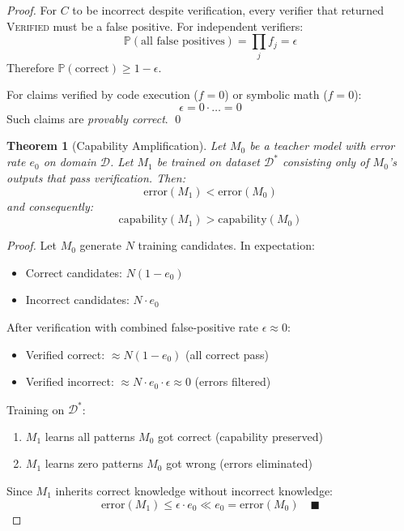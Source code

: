 \documentclass[11pt,a4paper]{article}
\newtheorem{theorem}{Theorem}[section]
\newcommand{\prob}{\mathbb{P}}
\newcommand{\calD}{\mathcal{D}}
\begin{document}
\begin{proof}
For $C$ to be incorrect despite verification, every verifier that returned \textsc{Verified} must be a false positive. For independent verifiers:
\begin{equation}
    \prob(\text{all false positives}) = \prod_j f_j = \epsilon
\end{equation}
Therefore $\prob(\text{correct}) \geq 1 - \epsilon$.

For claims verified by code execution ($f = 0$) or symbolic math ($f = 0$):
\begin{equation}
    \epsilon = 0 \cdot \ldots = 0
\end{equation}
Such claims are \emph{provably correct}. \qed
\end{proof}

\begin{theorem}[Capability Amplification]
\label{thm:amplification}
Let $M_0$ be a teacher model with error rate $e_0$ on domain $\calD$. Let $M_1$ be trained on dataset $\calD^*$ consisting only of $M_0$'s outputs that pass verification. Then:
\begin{equation}
    \text{error}(M_1) < \text{error}(M_0)
\end{equation}
and consequently:
\begin{equation}
    \text{capability}(M_1) > \text{capability}(M_0)
\end{equation}
\end{theorem}

\begin{proof}
Let $M_0$ generate $N$ training candidates. In expectation:
\begin{itemize}
    \item Correct candidates: $N(1 - e_0)$
    \item Incorrect candidates: $N \cdot e_0$
\end{itemize}

After verification with combined false-positive rate $\epsilon \approx 0$:
\begin{itemize}
    \item Verified correct: $\approx N(1 - e_0)$ (all correct pass)
    \item Verified incorrect: $\approx N \cdot e_0 \cdot \epsilon \approx 0$ (errors filtered)
\end{itemize}

Training on $\calD^*$:
\begin{enumerate}
    \item $M_1$ learns all patterns $M_0$ got correct (capability preserved)
    \item $M_1$ learns zero patterns $M_0$ got wrong (errors eliminated)
\end{enumerate}

Since $M_1$ inherits correct knowledge without incorrect knowledge:
\begin{equation}
    \text{error}(M_1) \leq \epsilon \cdot e_0 \ll e_0 = \text{error}(M_0) \quad \blacksquare
\end{equation}
\end{proof}
\end{document}
